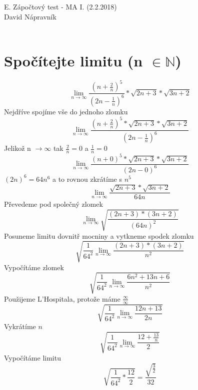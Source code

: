 \documentclass[a4paper,titlepage]{article}
\title{}
\author{David Nápravník}
\date{2018}
\begin{document}
\noindent E. Zápočtový test - MA I. (2.2.2018) \\
David Nápravník\\
\\
\section{Spočítejte limitu (n $\in \mathbb{N} $)}
$$
	\lim_{n \to \infty}\frac{(n +\frac{2}{n})^5}{(2n - \frac{1}{n})^6}*\sqrt{2n+3}*\sqrt{3n+2}
$$
Nejdříve spojíme vše do jednoho zlomku
$$
	\lim_{n \to \infty}\frac{(n +\frac{2}{n})^5*\sqrt{2n+3}*\sqrt{3n+2}}{(2n - \frac{1}{n})^6}
$$
Jelikož n $\to \infty $ tak $ \frac{2}{n} = 0 $ a $ \frac{1}{n} = 0 $
$$
	\lim_{n \to \infty}\frac{(n + 0)^5*\sqrt{2n+3}*\sqrt{3n+2}}{(2n - 0)^6}
$$
$(2n)^6 = 64 n^6$ a to rovnou zkrátíme s $n^5$
$$
	\lim_{n \to \infty}\frac{\sqrt{2n+3}*\sqrt{3n+2}}{64n}
$$
Převedeme pod společný zlomek
$$
	\lim_{n \to \infty}\sqrt{\frac{(2n+3)*(3n+2)}{(64n)^2}}
$$
Posuneme limitu dovnitř mocniny a vytkneme spodek zlomku
$$
	\sqrt{\frac{1}{64^2}\lim_{n \to \infty}{\frac{(2n+3)*(3n+2)}{n^2}}}
$$
Vypočítáme zlomek
$$
	\sqrt{\frac{1}{64^2}\lim_{n \to \infty}{\frac{6n^2+13n+6}{n^2}}}
$$
Použijeme L'Hospitala, protože máme $ \frac{\infty}{\infty}$
$$
	\sqrt{\frac{1}{64^2}\lim_{n \to \infty}{\frac{12n+13}{2n}}}
$$
Vykrátíme $n$
$$
	\sqrt{\frac{1}{64^2}\lim_{n \to \infty}{\frac{12+\frac{13}{n}}{2}}}
$$
Vypočítáme limitu
$$
	\sqrt{\frac{1}{64^2}*{\frac{12}{2}}} = \frac{\sqrt{\frac{3}{2}}}{32}
$$
\end{document}
